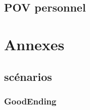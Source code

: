 \documentclass[oneside, a4paper, 11pt]{book}
\begin{document}
\section{POV personnel}

\appendix

\chapter{Annexes}
\section{scénarios}
\subsection{GoodEnding}
\label{scenar:goodEnding}

\backmatter
%
%
\printindex
\end{document}
